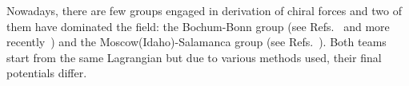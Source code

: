 
Nowadays, there are few groups engaged in derivation of chiral forces and two of them have dominated the field: the Bochum-Bonn group (see Refs.~\cite{Epelbaum2015,Epelbaum2006,Epelbaum2009,Epelbaum2015a} and more recently~\cite{Reinert2018}) and the Moscow(Idaho)-Salamanca group (see Refs.~\cite{Entem2017,Machleidt2011,Machleidt2013,Machleidt2016,Machleidt2018}). Both teams start from the same Lagrangian but due to various methods used, their final potentials differ. 

